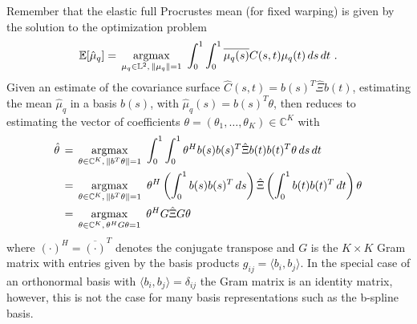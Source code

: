  Remember that the elastic full Procrustes mean (for fixed warping) is given by the solution to the optimization problem
\begin{equation}
\mathbb{E}[\hat\mu_q] = \, \operatorname*{argmax}_{\mu_q \in \mathbb{L}^2,\,\lVert\mu_q\rVert = 1}\,\,
   \int_0^1 \int_0^1 \overline{\mu_q (s)} C(s,t) \mu_q(t) \,ds\,dt\,\,.
\end{equation}
Given an estimate of the covariance surface $\hat{C}(s,t) = b(s)^T \hat\Xi b(t)$, estimating  the mean $\hat \mu_q$ in a basis $b(s)$, with $\hat \mu_q (s) = b(s)^T \theta$, then reduces to estimating the vector of coefficients $\theta = (\theta_1, \dots, \theta_K) \in \mathbb{C}^K$ with
\begin{align}
  \hat\theta& \, = \, \operatorname*{argmax}_{\theta \in \mathbb{C}^K,\,\lVert b^T\theta\rVert = 1}\,\,
    \int_0^1 \int_0^1 \theta^H b(s) b(s)^T \hat\Xi b(t) b(t)^T \theta \,ds\,dt \\
  &\, = \, \operatorname*{argmax}_{\theta \in \mathbb{C}^K,\,\lVert b^T\theta\rVert = 1}\,\,
    \theta^H \left( \int_0^1 b(s) b(s)^T \,ds \right) \hat\Xi \left( \int_0^1 b(t) b(t)^T \,dt\right) \theta \\
  &\, = \, \operatorname*{argmax}_{\theta \in \mathbb{C}^K,\,\theta^H G \theta = 1}\,\,
    \theta^H G \hat\Xi G \theta 
\end{align}
where $(\cdot)^H = \overline{(\cdot)}^T$ denotes the conjugate transpose and $G$ is the $K \times K$ Gram matrix with entries given by the basis products $g_{ij} = \langle b_i, b_j \rangle$.
In the special case of an orthonormal basis with $\langle b_i, b_j \rangle = \delta_{ij}$ the Gram matrix is an identity matrix, however, this is not the case for many basis representations such as the b-spline basis.


